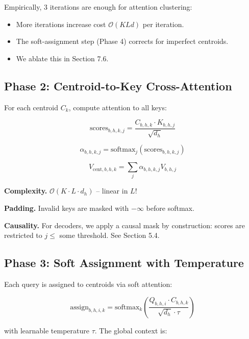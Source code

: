Empirically, 3 iterations are enough for attention clustering:

\begin{itemize}
\item More iterations increase cost $\mathcal{O}(K L d)$ per iteration.
\item The soft-assignment step (Phase 4) corrects for imperfect centroids.
\item We ablate this in Section 7.6.

\end{itemize}
\subsection{Phase 2: Centroid-to-Key Cross-Attention}

For each centroid $C_k$, compute attention to all keys:

\begin{equation}
\text{scores}_{b,h,k,j} = \frac{C_{b,h,k} \cdot K_{b,h,j}}{\sqrt{d_h}}
\end{equation}

\begin{equation}
\alpha_{b,h,k,j} = \text{softmax}_j(\text{scores}_{b,h,k,j})
\end{equation}

\begin{equation}
V_{\text{cent}, b,h,k} = \sum_j \alpha_{b,h,k,j} V_{b,h,j}
\end{equation}

\textbf{Complexity.} $\mathcal{O}(K \cdot L \cdot d_h)$ -- linear in $L$!

\textbf{Padding.} Invalid keys are masked with $-\infty$ before softmax.

\textbf{Causality.} For decoders, we apply a causal mask by construction: 
scores are restricted to $j \leq$ some threshold. See Section 5.4.

\subsection{Phase 3: Soft Assignment with Temperature}

Each query is assigned to centroids via soft attention:

\begin{equation}
\text{assign}_{b,h,i,k} = \text{softmax}_k\!\left(\frac{Q_{b,h,i} \cdot C_{b,h,k}}{\sqrt{d_h} \cdot \tau}\right)
\end{equation}

with learnable temperature $\tau$. The global context is:

